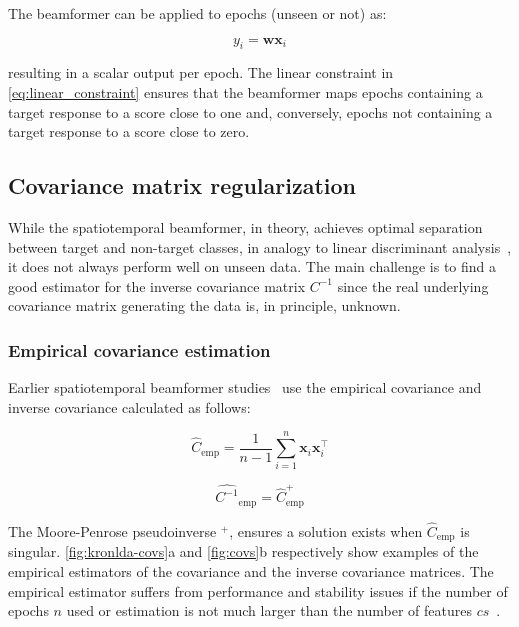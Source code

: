 \begin{refsection}
	The beamformer can be applied to epochs (unseen or not) as:

	\begin{equation}
		y_i = \mathbf{w}\mathbf{x}_i
		\label{eq:apply_beamformer}
	\end{equation}

	resulting in a scalar output per epoch.
	The linear constraint in \autoref{eq:linear_constraint} ensures that the
	beamformer maps epochs containing a target response to a score close to one
	and, conversely, epochs not containing a target response to a score close to
	zero.

	\subsection{Covariance matrix regularization}
	While the spatiotemporal beamformer, in theory, achieves optimal separation
	between target and non-target classes, in analogy to linear discriminant analysis~\cite{TREDER2016279}, it does not always perform well on unseen data.
	The main challenge is to find a good estimator for the inverse covariance matrix $C^{-1}$ since the real underlying covariance matrix generating the data is, in principle, unknown.

	\subsubsection{Empirical covariance estimation}
	\label{sec:empirical_covariance}
	Earlier spatiotemporal beamformer studies~\cite{Wittevrongel2016,
		Wittevrongel2016a, Wittevrongel2017, Wittevrongel2017a} use the empirical
	covariance and inverse covariance calculated as follows:

	\begin{equation}
		\hat{C}_\text{emp} =
		\frac{1}{n-1}\sum^{n}_{i=1}\mathbf{x}_i\mathbf{x}_i^\intercal
		\label{eq:empirical_covariance}
	\end{equation}


	\begin{equation}
		\widehat{C^{-1}}_\text{emp} = \hat{C}_\text{emp}^+
		\label{eq:empirical_inverse_covariance}
	\end{equation}

	The Moore-Penrose pseudoinverse $^+$, ensures a solution exists when $\hat{C}_\text{emp}$ is singular.
	\autoref{fig:kronlda-covs}a and \autoref{fig:covs}b respectively show examples of the
	empirical estimators of the covariance and the inverse covariance matrices.
	The empirical estimator suffers from performance and
	stability issues if the number of epochs $n$ used or estimation is not much larger than the number of features $cs$~\cite{Stein1956,Khatri1987}.


\end{refsection}

